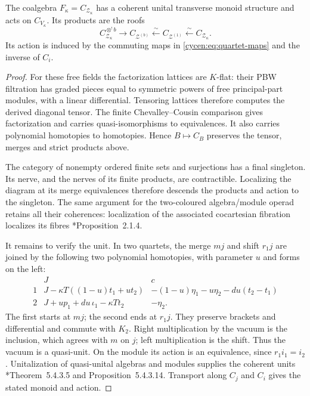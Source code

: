 \begin{proposition}\label{cycen:prop:heisenberg-monoid}
The coalgebra
$F_\kappa=C_{\mathcal Z_\kappa}$ has a coherent unital
transverse monoid structure and acts on $C_{V_\kappa}$.
Its products are the roofs
\[
 C_{\mathcal Z_\kappa}^{\otimes^! b}
 \longrightarrow C_{\mathcal Z^{(b)}}
 \xleftarrow{\sim}C_{\mathcal Z^{(1)}}
 \xleftarrow{\sim}C_{\mathcal Z_\kappa}.
\]
Its action is induced by the commuting maps in
\eqref{cycen:eq:quartet-maps} and the inverse of $C_i$.
\end{proposition}
\begin{proof}
For these free fields the factorization lattices are
$K$-flat: their PBW filtration has graded pieces equal to
symmetric powers of free principal-part modules, with a
linear differential. Tensoring lattices therefore computes
the derived diagonal tensor. The finite Chevalley--Cousin
comparison gives factorization and carries quasi-isomorphisms
to equivalences. It also carries polynomial homotopies to
homotopies. Hence $B\mapsto C_B$ preserves the tensor,
merges and strict products above.

The category of nonempty ordered finite sets and surjections
has a final singleton. Its nerve, and the nerves of its finite
products, are contractible. Localizing the diagram at its
merge equivalences therefore descends the products and action
to the singleton. The same argument for the two-coloured
algebra/module operad retains all their coherences: localization
of the associated cocartesian fibration localizes its fibres
\cite{cycen:HinichLocalization}*{Proposition~2.1.4}.

It remains to verify the unit. In two quartets, the merge
$mj$ and shift $r_1j$ are joined by the following two
polynomial homotopies, with parameter $u$ and forms on the left:
\[
 \begin{array}{c|cc}
  &J&c\\ \hline
  1&J-\kappa T((1-u)t_1+ut_2)
    &-(1-u)\eta_1-u\eta_2-du(t_2-t_1)\\
  2&J+up_1+du\,\iota_1-\kappa Tt_2&-\eta_2.
 \end{array}
\]
The first starts at $mj$; the second ends at $r_1j$.
They preserve brackets and differential and commute with
$K_2$. Right multiplication by the vacuum is the inclusion,
which agrees with $m$ on $j$; left multiplication is the
shift. Thus the vacuum is a quasi-unit. On the module its
action is an equivalence, since $r_1i_1=i_2$. Unitalization
of quasi-unital algebras and modules supplies the coherent
units \cite{LurieHA}*{Theorem~5.4.3.5 and
Proposition~5.4.3.14}. Transport along $C_j$ and $C_i$
gives the stated monoid and action.
\end{proof}

